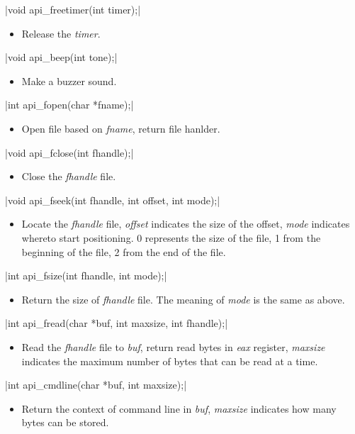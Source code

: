 \documentclass{swfcthesis}
\begin{document}
\csingle|void api_freetimer(int timer);|
\begin{itemize}
\item Release the \emph{timer}.
\end{itemize}

\csingle|void api_beep(int tone);|
\begin{itemize}
\item Make a buzzer sound.
\end{itemize}

\csingle|int api_fopen(char *fname);|
\begin{itemize}
\item Open file based on \emph{fname}, return file hanlder.
\end{itemize}

\csingle|void api_fclose(int fhandle);|
\begin{itemize}
\item Close the \emph{fhandle} file.
\end{itemize}

\csingle|void api_fseek(int fhandle, int offset, int mode);|
\begin{itemize}
\item Locate the \emph{fhandle} file, \emph{offset} indicates the size of the offset,
  \emph{mode} indicates whereto start positioning. 0 represents the size of the file, 1
  from the beginning of the file, 2 from the end of the file.
  
\end{itemize}

\csingle|int api_fsize(int fhandle, int mode);|
\begin{itemize}
\item Return the size of \emph{fhandle} file. The meaning of \emph{mode} is the same as
  above.
\end{itemize}

\csingle|int api_fread(char *buf, int maxsize, int fhandle);|
\begin{itemize}
\item Read the \emph{fhandle} file to \emph{buf}, return read bytes in \emph{eax}
  register, \emph{maxsize} indicates the maximum number of bytes that can be read at a
  time.
    
\end{itemize}

\csingle|int api_cmdline(char *buf, int maxsize);|
\begin{itemize}
\item Return the context of command line in \emph{buf}, \emph{maxsize} indicates how many
  bytes can be stored.
  
\end{itemize}
\end{document}

